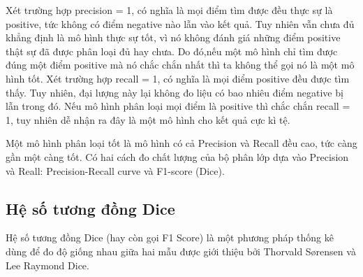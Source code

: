 Xét trường hợp precision = 1, có nghĩa là mọi điểm tìm được đều thực sự là positive, tức không có điểm negative nào lẫn vào kết quả. Tuy nhiên vẫn chưa đủ khẳng định là mô hình thực sự tốt, vì nó không đánh giá những điểm positive thật sự đã được phân loại đủ hay chưa. Do đó,nếu một mô hình chỉ tìm được đúng một điểm positive mà nó chắc chắn nhất thì ta không thể gọi nó là một mô hình tốt.
\newpage
Xét trường hợp recall = 1, có nghĩa là mọi điểm positive đều được tìm thấy. Tuy nhiên, đại lượng này lại không đo liệu có bao nhiêu điểm negative bị lẫn trong đó. Nếu mô hình phân loại mọi điểm là positive thì chắc chắn recall = 1, tuy nhiên dễ nhận ra đây là một mô hình cho kết quả cực kì tệ.\par

Một mô hình phân loại tốt là mô hình có cả Precision và Recall đều cao, tức càng gần một càng tốt. Có hai cách đo chất lượng của bộ phân lớp dựa vào Precision và Reall: Precision-Recall curve và F1-score (Dice).
\vspace{-0.25cm}




\subsection{Hệ số tương đồng Dice}
Hệ số tương đồng Dice (hay còn gọi F1 Score) là một phương pháp thống kê dùng để đo độ giống nhau giữa hai mẫu được giới thiệu bởi Thorvald Sørensen\cite{dice1} và Lee Raymond Dice\cite{dice}. \par

